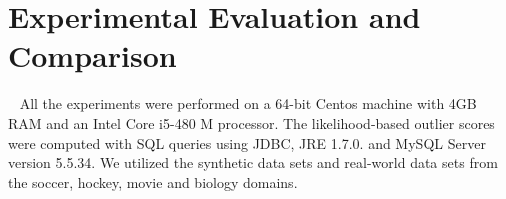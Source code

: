 {				\section{Experimental Evaluation and Comparison}~\label{sec:Experiments}
				All the experiments were performed on a 64-bit Centos machine with 4GB RAM and an Intel Core i5-480 M processor. The likelihood-based outlier scores were computed with SQL queries using JDBC, JRE 1.7.0. and MySQL Server version 5.5.34.
				We utilized the synthetic data sets and real-world data sets from the soccer, hockey, movie and biology domains.
				
								
				
				

}

